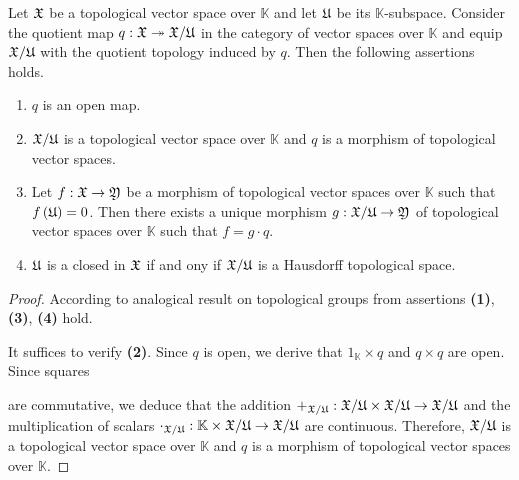 \documentclass[10pt]{amsart}
\begin{document}
\begin{theorem}\label{theorem:quotients_of_topological_vector_spaces}
	Let ${\mathfrak X}$ be a topological vector space over $\mathbb{K}$ and let ${\mathfrak U}$ be its $\mathbb{K}$-subspace. Consider the quotient map $q:{\mathfrak X}\twoheadrightarrow {\mathfrak X}/{\mathfrak U}$ in the category of vector spaces over $\mathbb{K}$ and equip ${\mathfrak X}/{\mathfrak U}$ with the quotient topology induced by $q$. Then the following assertions holds.
	\begin{enumerate}[label=\emph{\textbf{(\arabic*)}}, leftmargin=*]
		\item $q$ is an open map.
		\item ${\mathfrak X}/{\mathfrak U}$ is a topological vector space over $\mathbb{K}$ and $q$ is a morphism of topological vector spaces.
		\item Let $f:{\mathfrak X}\rightarrow {\mathfrak Y}$ be a morphism of topological vector spaces over $\mathbb{K}$ such that $f\left({\mathfrak U}\right) = 0$. Then there exists a unique morphism $g:{\mathfrak X}/{\mathfrak U}\rightarrow {\mathfrak Y}$ of topological vector spaces over $\mathbb{K}$ such that $f = g\cdot q$.
		\item ${\mathfrak U}$ is a closed in ${\mathfrak X}$ if and ony if ${\mathfrak X}/{\mathfrak U}$ is a Hausdorff topological space.
	\end{enumerate}
\end{theorem}
\begin{proof}
	According to analogical result on topological groups from \cite{Topological_groups} assertions \textbf{(1)}, \textbf{(3)}, \textbf{(4)} hold.

	It suffices to verify \textbf{(2)}. Since $q$ is open, we derive that $1_{\mathbb{K}}\times q$ and $q\times q$ are open. Since squares
	\begin{center}
	\end{center}
	are commutative, we deduce that the addition $+_{{\mathfrak X}/{\mathfrak U}}:{\mathfrak X}/{\mathfrak U} \times {\mathfrak X}/{\mathfrak U} \rightarrow {\mathfrak X}/{\mathfrak U}$ and the multiplication of scalars $\cdot_{{\mathfrak X}/{\mathfrak U}}:\mathbb{K}\times {\mathfrak X}/{\mathfrak U}\rightarrow {\mathfrak X}/{\mathfrak U}$ are continuous. Therefore, ${\mathfrak X}/{\mathfrak U}$ is a topological vector space over $\mathbb{K}$ and $q$ is a morphism of topological vector spaces over $\mathbb{K}$.
\end{proof}
\end{document}
